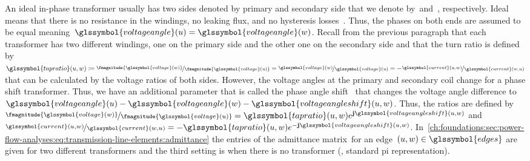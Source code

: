 An ideal in-phase transformer usually has two sides denoted by primary and
secondary side that we denote by~\vertexa and~\vertexc, respectively. Ideal
means that there is no resistance in the windings, no leaking flux, and no
hysteresis losses~\parencite[p.17]{Cai12}. Thus, the phases on both ends are
assumed to be equal meaning~$\glssymbol{voltageangle}(\vertexa) =
\glssymbol{voltageangle}(\vertexc)$. Recall from the previous paragraph that
each transformer has two different windings, one on the primary side and the
other one on the secondary side and that the turn ratio is defined by~$
\glssymbol{tapratio}(\vertexa,\vertexc)\coloneqq\nicefrac{\fmagnitude{
\glssymbol{voltage}(\vertexc)}} {\fmagnitude{\glssymbol{voltage}(\vertexa)}} =
\nicefrac{\glssymbol{voltage}(\vertexc)}{\glssymbol{voltage} (\vertexa)} = -
\nicefrac{\glssymbol{current}(\vertexa, \vertexc)}{\glssymbol{current} (\vertexc, \vertexa)}$ that can
be calculated by the voltage ratios of both sides. However, the voltage angles
at the primary and secondary coil change for a phase shift transformer. Thus, we
have an additional parameter that is called the phase angle
shift~ that changes the voltage angle difference
to~$\glssymbol{voltageangle}(\vertexa)
- \glssymbol{voltageangle}(\vertexc) -
  \glssymbol{voltageangleshift}(\vertexa,\vertexc)$. Thus, the ratios are
  defined by~$\nicefrac{\fmagnitude{\glssymbol{voltage}(\vertexc)}}{
\fmagnitude{\glssymbol{voltage}(\vertexa)}} =
\glssymbol{tapratio}(\vertexa,\vertexc)e^{\imgPart\glssymbol{voltageangleshift}
(\vertexa,\vertexc)}$ and~$\nicefrac{\glssymbol{current}(\vertexa,
\vertexc)}{\glssymbol{current}(\vertexc, \vertexa)} =
-\glssymbol{tapratio}(\vertexa,\vertexc)e^{-\imgPart\glssymbol{voltageangleshift}
(\vertexa,\vertexc)}$.
In~\cref{ch:foundations:sec:power-flow-analyses:eq:transmission-line-elements:admittance}
the entries of the admittance matrix~\admittanceMatrix for an edge~$
(\vertexa,\vertexc)\in\glssymbol{edges}$ are given for two different
transformers and the third setting is when there is no transformer (\ie,
standard pi representation).
% 
